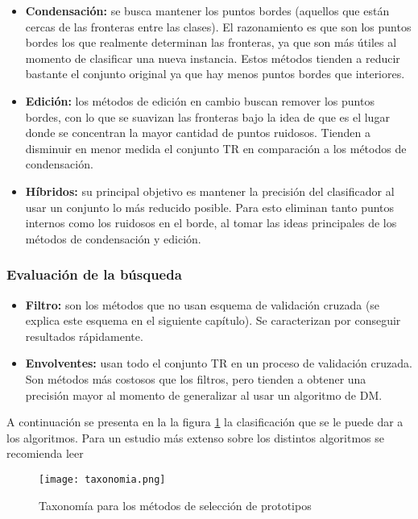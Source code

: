 \begin{itemize}
\item \textbf{Condensación:}
se busca mantener los puntos bordes (aquellos que están cercas de las fronteras entre las clases). El razonamiento es que son los puntos bordes los que realmente determinan las fronteras, ya que son más útiles al momento de clasificar una nueva instancia. Estos métodos tienden a reducir bastante el conjunto original ya que hay menos puntos bordes que interiores.

\item \textbf{Edición:}
los métodos de edición en cambio buscan remover los puntos bordes, con lo que se suavizan las fronteras bajo la idea de que es el lugar donde se concentran la mayor cantidad de puntos ruidosos. Tienden a disminuir en menor medida el conjunto TR en comparación a los métodos de condensación.

\item \textbf{Híbridos:}
su principal objetivo es mantener la precisión del clasificador al usar un conjunto lo más reducido posible. Para esto eliminan tanto puntos internos como los ruidosos en el borde, al tomar las ideas principales de los métodos de condensación y edición.
\end{itemize}

\subsubsection{Evaluación de la búsqueda}

\begin{itemize}
\item \textbf{Filtro:}
son los métodos que no usan esquema de validación cruzada (se explica este esquema en el siguiente capítulo). Se caracterizan por conseguir resultados rápidamente. 

\item \textbf{Envolventes:}
usan todo el conjunto TR en un proceso de validación cruzada. Son métodos más costosos que los filtros, pero tienden a obtener una precisión mayor al momento de generalizar al usar un algoritmo de DM.
\end{itemize}

A continuación se presenta en la la figura \ref{taxonomia} la clasificación que se le puede dar a los algoritmos. Para un estudio más extenso sobre los distintos algoritmos se recomienda leer \cite{garcia2016data}

\begin{figure}[]
\centering
\texttt{[image: taxonomia.png]}
\caption[Taxonomía para los métodos de selección de prototipos]{Taxonomía para los métodos de selección de prototipos}
\label{taxonomia}
\end{figure}

